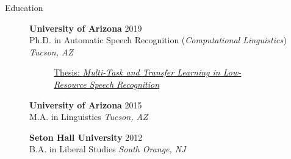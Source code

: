 \documentclass{cv} %
\begin{document}
\vspace{.5cm}
\begin{rSection}{Education}

    \begin{figure}[H]
    \begin{minipage}{0.2\textwidth}
      \centering
      
    \end{minipage}
    \begin{minipage}{0.8\textwidth}
      {\bf University of Arizona} \hfill {2019} \\
      Ph.D. in Automatic Speech Recognition (\textit{Computational Linguistics}) \hfill {\em Tucson, AZ}
      \vspace{-0.25cm}
   \begin{figure}[H]
    \begin{minipage}{\textwidth}
      
      \footnotesize{\href{http://jrmeyer.github.io/misc/MEYER_dissertation_2019.pdf}{Thesis: \textit{Multi-Task and Transfer Learning in Low-Resource Speech Recognition}} }
      \end{minipage}
  \end{figure}

    \end{minipage}
    \end{figure}
    
  \begin{figure}[H]
    \begin{minipage}{0.2\textwidth}
      \centering
      
    \end{minipage}
    \begin{minipage}{0.8\textwidth}
{\bf University of Arizona} \hfill {2015} \\
M.A. in Linguistics \hfill {\em Tucson, AZ}
    \end{minipage}
  \end{figure}
  
  \begin{figure}[H]
    \begin{minipage}{0.2\textwidth}
      \centering
      
    \end{minipage}
    \begin{minipage}{0.8\textwidth}
{\bf Seton Hall University} \hfill {2012} \\
B.A. in Liberal Studies \hfill {\em South Orange, NJ}
    \end{minipage}
  \end{figure}


\end{rSection}
\end{document}
